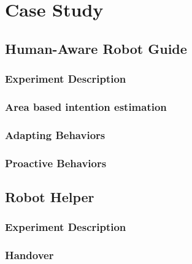 
\chapter{Case Study} %

\label{chapter-case_study} %




\section{Human-Aware Robot Guide}
\subsection{Experiment Description}
\subsection{Area based intention estimation}
\subsection{Adapting Behaviors}
\subsection{Proactive Behaviors}

\section{Robot Helper}
\subsection{Experiment Description}
\subsection{Handover}




